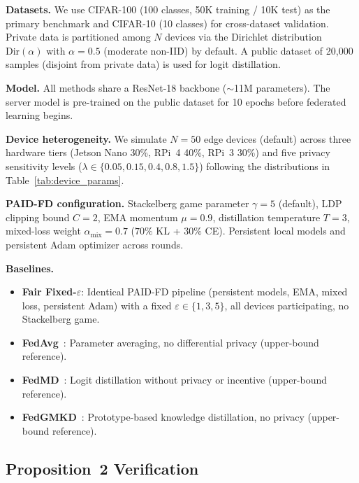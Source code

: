 \textbf{Datasets.}
We use CIFAR-100 (100 classes, 50K training / 10K test) as the primary
benchmark and CIFAR-10 (10 classes) for cross-dataset validation.
Private data is partitioned among $N$ devices via the Dirichlet distribution
$\mathrm{Dir}(\alpha)$ with $\alpha = 0.5$ (moderate non-IID) by default.
A public dataset of 20{,}000 samples (disjoint from private data) is used
for logit distillation.

\textbf{Model.}
All methods share a ResNet-18 backbone ($\sim$11M parameters).
The server model is pre-trained on the public dataset for 10 epochs
before federated learning begins.

\textbf{Device heterogeneity.}
We simulate $N = 50$ edge devices (default) across three hardware tiers
(Jetson Nano 30\%, RPi~4 40\%, RPi~3 30\%) and five privacy sensitivity
levels ($\lambda \in \{0.05, 0.15, 0.4, 0.8, 1.5\}$) following the
distributions in Table~\ref{tab:device_params}.

\textbf{PAID-FD configuration.}
Stackelberg game parameter $\gamma = 5$ (default), LDP clipping bound $C = 2$,
EMA momentum $\mu = 0.9$, distillation temperature $T = 3$,
mixed-loss weight $\alpha_\text{mix} = 0.7$ ($70\%$ KL + $30\%$ CE).
Persistent local models and persistent Adam optimizer across rounds.

\textbf{Baselines.}
\begin{itemize}
    \item \textbf{Fair Fixed-$\varepsilon$}: Identical PAID-FD pipeline
          (persistent models, EMA, mixed loss, persistent Adam) with a
          fixed $\varepsilon \in \{1, 3, 5\}$, all devices participating,
          no Stackelberg game.
    \item \textbf{FedAvg}~\cite{mcmahan2017fedavg}: Parameter averaging,
          no differential privacy (upper-bound reference).
    \item \textbf{FedMD}~\cite{li2019fedmd}: Logit distillation without
          privacy or incentive (upper-bound reference).
    \item \textbf{FedGMKD}~\cite{wu2024fedgmkd}: Prototype-based knowledge
          distillation, no privacy (upper-bound reference).
\end{itemize}

\subsection{Proposition~2 Verification}\label{sec:prop2}

